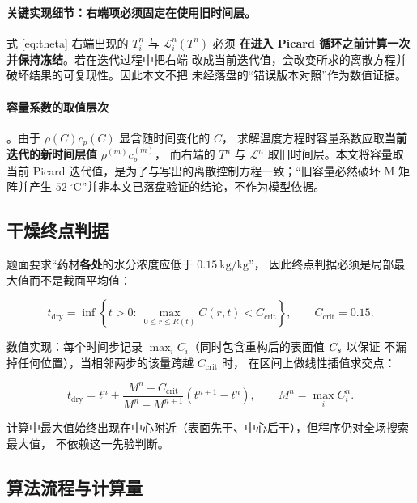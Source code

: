 \paragraph{关键实现细节：右端项必须固定在使用旧时间层。}
式 \eqref{eq:theta} 右端出现的 $T_i^n$ 与 $\mathcal{L}^n_i(T^n)$ 必须
\textbf{在进入 Picard 循环之前计算一次并保持冻结}。若在迭代过程中把右端
改成当前迭代值，会改变所求的离散方程并破坏结果的可复现性。因此本文不把
未经落盘的“错误版本对照”作为数值证据。

\paragraph{容量系数的取值层次}。由于 $\rho(C)c_p(C)$ 显含随时间变化的 $C$，
求解温度方程时容量系数应取\textbf{当前迭代的新时间层值} $\rho^{(m)}c_p^{(m)}$，
而右端的 $T^n$ 与 $\mathcal{L}^n$ 取旧时间层。本文将容量取当前 Picard
迭代值，是为了与写出的离散控制方程一致；“旧容量必然破坏 M 矩阵并产生
$52\ ^\circ\mathrm{C}$”并非本文已落盘验证的结论，不作为模型依据。

\subsection{干燥终点判据}

题面要求“药材\textbf{各处}的水分浓度应低于 $0.15\ \mathrm{kg/kg}$”，
因此终点判据必须是局部最大值而不是截面平均值：

\begin{equation}
t_{\mathrm{dry}}=\inf\left\{t>0:\ \max_{0\le r\le R(t)}C(r,t)<C_{\mathrm{crit}}\right\},
\qquad C_{\mathrm{crit}}=0.15 .
\end{equation}

数值实现：每个时间步记录 $\max_i C_i$（同时包含重构后的表面值 $C_{s}$ 以保证
不漏掉任何位置），当相邻两步的该量跨越 $C_{\mathrm{crit}}$ 时，
在区间上做线性插值求交点：

\begin{equation}
t_{\mathrm{dry}}=t^{n}+\frac{M^n-C_{\mathrm{crit}}}{M^n-M^{n+1}}\left(t^{n+1}-t^n\right),
\qquad M^n=\max_i C_i^n .
\end{equation}

计算中最大值始终出现在中心附近（表面先干、中心后干），但程序仍对全场搜索最大值，
不依赖这一先验判断。

\subsection{算法流程与计算量}


